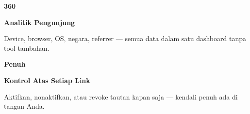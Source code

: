 \documentclass[a4paper]{article}
\begin{document}
\begin{minipage}[t]{0.485\textwidth}
    \noindent\colorbox{BlueBg}{%
        \begin{minipage}[t]{\dimexpr\linewidth-2\fboxsep}
            \vspace{6pt}
            {\fontsize{20}{24}\selectfont\bfseries\color{CyanPrimary} 360\textdegree}\par\vspace{2pt}
            {\fontsize{9.5}{12}\selectfont\bfseries\color{BlueDark} Analitik Pengunjung}\par\vspace{2pt}
            {\fontsize{8.5}{11}\selectfont\color{TextDark}Device, browser, OS, negara, referrer --- semua data dalam satu dashboard tanpa tool tambahan.}%
            \vspace{6pt}
        \end{minipage}}%
    \vspace{6pt}
    \noindent\colorbox{BlueBg}{%
        \begin{minipage}[t]{\dimexpr\linewidth-2\fboxsep}
            \vspace{6pt}
            {\fontsize{20}{24}\selectfont\bfseries\color{CyanPrimary} Penuh}\par\vspace{2pt}
            {\fontsize{9.5}{12}\selectfont\bfseries\color{BlueDark} Kontrol Atas Setiap Link}\par\vspace{2pt}
            {\fontsize{8.5}{11}\selectfont\color{TextDark}Aktifkan, nonaktifkan, atau revoke tautan kapan saja --- kendali penuh ada di tangan Anda.}%
            \vspace{6pt}
        \end{minipage}}%
\end{minipage}

\vspace{8pt}
\end{document}
